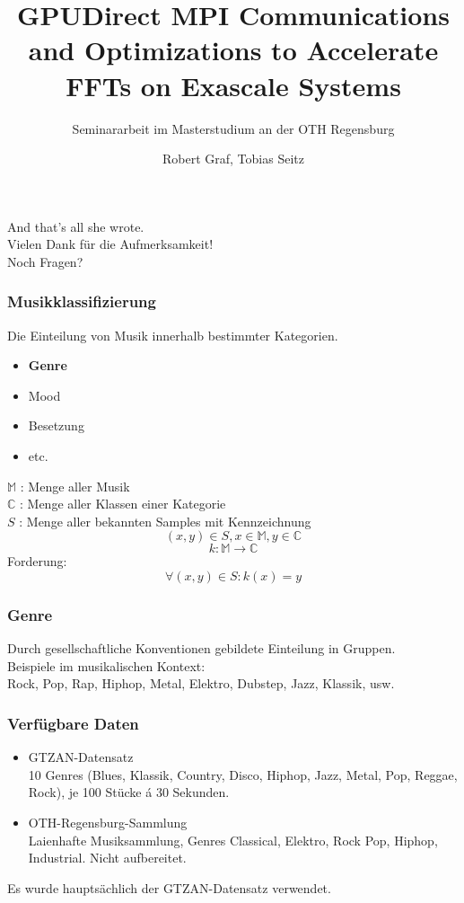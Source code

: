 \documentclass{beamer}
\title{GPUDirect MPI Communications and Optimizations to Accelerate FFTs on Exascale Systems}
\subtitle{Seminararbeit im Masterstudium an der OTH Regensburg}
\author{Robert Graf, Tobias Seitz}
\begin{document}
\frame
{
	\titlepage
}




\frame
{
	\begin{center}
		And that's all she wrote.\\
		\Large Vielen Dank für die Aufmerksamkeit! \normalsize\\
		\tiny Noch Fragen? \normalsize
	\end{center}
}

\frame
{
	
	\frametitle{Musikklassifizierung}
	Die Einteilung von Musik innerhalb bestimmter Kategorien.
	\begin{itemize}
		\item \textbf{Genre}
		\item Mood
		\item Besetzung
		\item etc.
	\end{itemize}
$\mathbb{M}$ : Menge aller Musik \\
$\mathbb{C}$ : Menge aller Klassen einer Kategorie\\
$S$ : Menge aller bekannten Samples mit Kennzeichnung 
$$(x,y) \in S, x \in \mathbb{M}, y \in \mathbb{C}$$
$$k : \mathbb{M} \rightarrow \mathbb{C}$$
Forderung:
$$\forall (x,y) \in S : k(x) = y$$

}
\frame
{
	\frametitle{Genre}
	Durch gesellschaftliche Konventionen gebildete Einteilung in Gruppen.\\
	Beispiele im musikalischen Kontext:\\
	Rock, Pop, Rap, Hiphop, Metal, Elektro, Dubstep, Jazz, Klassik, usw.
}

\frame
{
	\frametitle{Verfügbare Daten}
	\begin{itemize}
		\item GTZAN-Datensatz\\
			10 Genres (Blues, Klassik, Country, Disco, Hiphop, Jazz, Metal, Pop, Reggae, Rock), je 100 Stücke á 30 Sekunden.
		\item OTH-Regensburg-Sammlung\\
			Laienhafte Musiksammlung, Genres Classical, Elektro, Rock Pop, Hiphop, Industrial. Nicht aufbereitet.
	\end{itemize}
	Es wurde hauptsächlich der GTZAN-Datensatz verwendet.
}
\end{document}
